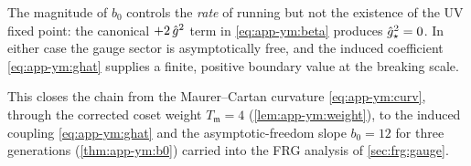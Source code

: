 \begin{remark}
\label{rem:app-ym:freedom}
The magnitude of $b_{0}$ controls the \emph{rate} of running but not the
existence of the UV fixed point: the canonical $+2\,\hat g^{2}$ term in
\eqref{eq:app-ym:beta} produces $\hat g^{2}_{\star}=0$. In either case the
gauge sector is asymptotically free, and the induced coefficient
\eqref{eq:app-ym:ghat} supplies a finite, positive boundary value at the
breaking scale.
\end{remark}

This closes the chain from the Maurer--Cartan curvature
\eqref{eq:app-ym:curv}, through the corrected coset weight
$T_{\mathfrak m}=4$ (\autoref{lem:app-ym:weight}), to the induced
coupling \eqref{eq:app-ym:ghat} and the asymptotic-freedom slope
$b_{0}=12$ for three generations (\autoref{thm:app-ym:b0}) carried into
the FRG analysis of \autoref{sec:frg:gauge}.
